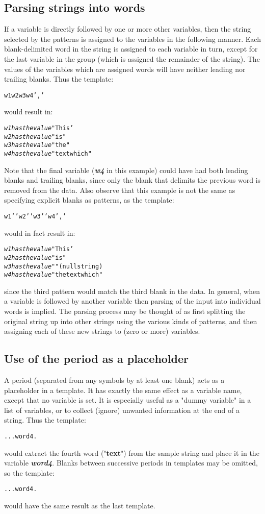 \subsection{Parsing strings into words}
 If a variable is directly followed by one or more other variables,
then the string selected by the patterns is assigned to the variables
in the following manner.
Each blank-delimited word in the string is
assigned to each variable in turn, except for the last variable in the
group (which is assigned the remainder of the string).
The values of the variables which are assigned words will have neither
leading nor trailing blanks.
 Thus the template:
\begin{alltt}
w1 w2 w3 w4 ','
\end{alltt}
would result in:
\begin{alltt}
\emph{w1} \emph{has the value} "This'
\emph{w2} \emph{has the value} "is"
\emph{w3} \emph{has the value} "the"
\emph{w4} \emph{has the value} "text which"
\end{alltt}
Note that the final variable (\textbf{\emph{w4}} in this
example) could have had both leading blanks and trailing blanks, since
only the blank that delimits the previous word is removed from the data.
 Also observe that this example is not the same as specifying
explicit blanks as patterns, as the template:
\begin{alltt}
w1 ' ' w2 ' ' w3 ' ' w4 ','
\end{alltt}
would in fact result in:
\begin{alltt}
\emph{w1} \emph{has the value} "This'
\emph{w2} \emph{has the value} "is"
\emph{w3} \emph{has the value} ""  (null string)
\emph{w4} \emph{has the value} "the text which"
\end{alltt}
since the third pattern would match the third blank in the data.
 In general, when a variable is followed by another variable then
parsing of the input into individual words is implied.
The parsing process may be thought of as first splitting the original
string up into other strings using the various kinds of patterns, and
then assigning each of these new strings to (zero or more) variables.
\subsection{Use of the period as a placeholder}\label{refplaceh}
 A period (separated from any symbols by at least one blank) acts as a
placeholder in a template.
It has exactly the same effect as a variable name, except that no
variable is set.
It is especially useful as a "dummy variable" in a list of
variables, or to collect (ignore) unwanted information at the end of a
string.  Thus the template:
\begin{alltt}
 . . . word4 .
\end{alltt}
would extract the fourth word ("\textbf{text}") from the sample
string and place it in the variable \textbf{\emph{word4}}.
Blanks between successive periods in templates may be omitted, so the
template:
\begin{alltt}
 ... word4 .
\end{alltt}
would have the same result as the last template.
